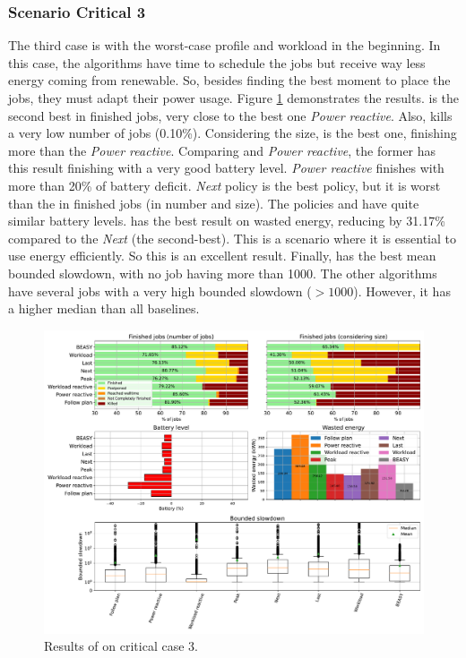 \clearpage

\subsubsection{Scenario Critical 3}

The third case is with the worst-case profile and workload in the beginning. In this case, the algorithms have time to schedule the jobs but receive way less energy coming from renewable. So, besides finding the best moment to place the jobs, they must adapt their power usage. Figure \ref{fig:beasy_critical_3} demonstrates the results. \emph{\systemName} is the second best in finished jobs, very close to the best one \emph{Power reactive}. Also, \emph{\systemName} kills a very low number of jobs (0.10\%). Considering the size, \emph{\systemName} is the best one, finishing more than the \emph{Power reactive}. Comparing \emph{\systemName} and \emph{Power reactive}, the former has this result finishing with a very good battery level. \emph{Power reactive} finishes with more than 20\% of battery deficit. \emph{Next} policy is the best policy, but it is worst than the \emph{\systemName} in finished jobs (in number and size). The policies and \emph{\systemName} have quite similar battery levels. \emph{\systemName} has the best result on wasted energy, reducing by 31.17\% compared to the \emph{Next} (the second-best). This is a scenario where it is essential to use energy efficiently. So this is an excellent result. Finally, \emph{\systemName} has the best mean bounded slowdown, with no job having more than 1000. The other algorithms have several jobs with a very high bounded slowdown ($>1000$). However, it has a higher median than all baselines.

\begin{figure}[!htb]
    \centering
    \includegraphics[scale=0.39]{Images/Heuristic/profile_worst_workload_1_with_noise.pdf}
    \caption{Results of \emph{\systemName} on critical case 3.}
    \label{fig:beasy_critical_3}
\end{figure}


